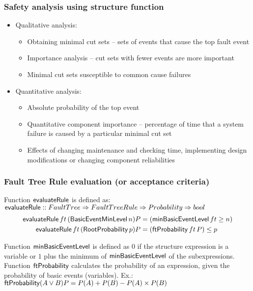 \begin{frame}
\frametitle{Safety analysis using structure function}

\begin{itemize}
  \item Qualitative analysis:
    \begin{itemize}
      \item Obtaining minimal cut sets -- sets of events that cause the top fault event 
      \item Importance analysis -- cut sets with fewer events are more important
      \item Minimal cut sets susceptible to common cause failures
    \end{itemize}
  \item Quantitative analysis:
    \begin{itemize}
      \item Absolute probability of the top event 
      \item Quantitative component importance -- percentage of time that a system failure is caused by a particular minimal cut set
      \item Effects of changing maintenance and checking time, implementing design modifications or changing component reliabilities
    \end{itemize}
\end{itemize}
\end{frame}

\begin{frame}
\frametitle{Fault Tree Rule evaluation (or acceptance criteria)}


Function $\operatorname{\mathsf{evaluateRule}}$ is defined as:
$\operatorname{\mathsf{evaluateRule}} :: FaultTree \Rightarrow FaultTreeRule \Rightarrow Probability \Rightarrow bool$
{
\footnotesize 
\begin{subequations}
\begin{align}
\operatorname{\mathsf{evaluateRule}} ft \, (\operatorname{\mathsf{BasicEventMinLevel}} n) P &= (\operatorname{\mathsf{minBasicEventLevel}} ft \ge n)\\
\operatorname{\mathsf{evaluateRule}} ft \, (\operatorname{\mathsf{RootProbability}} p) P &= (\operatorname{\mathsf{ftProbability}} ft \, P) \le p
\end{align}
\end{subequations}
}

Function $\operatorname{\mathsf{minBasicEventLevel}}$ is defined as $0$ if the structure expression is a variable or $1$ plus the minimum of $\operatorname{\mathsf{minBasicEventLevel}}$ of the subexpressions.
%
Function $\operatorname{\mathsf{ftProbability}}$ calculates the probability of an expression, given the probability of basic events (variables). Ex.: $\operatorname{\mathsf{ftProbability}} (A \lor B) P = P(A) + P(B) - P(A) \times P(B)$
\end{frame}

